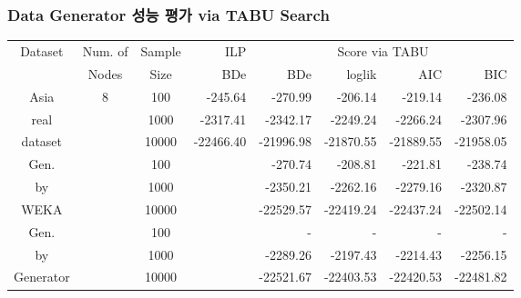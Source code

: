 \documentclass{beamer}
\begin{document}
\begin{frame}
\frametitle{Data Generator 성능 평가 via TABU Search}
{\scriptsize{}

\begin{center}
\begin{tabular}{c|c|c|r|r|r|r|r}
\hline 
\multirow{2}{*}{{\tiny{}Dataset}} & {\tiny{}Num. of} & {\tiny{}Sample} & {\tiny{}ILP} & \multicolumn{4}{c}{{\tiny{}Score via TABU}}\tabularnewline
\cline{4-8} 
 & {\tiny{}Nodes} & {\tiny{}Size} & {\tiny{}BDe} & {\tiny{}BDe} & {\tiny{}loglik} & {\tiny{}AIC} & {\tiny{}BIC}\tabularnewline
\hline 
{\tiny{}Asia} & \multirow{9}{*}{{\tiny{}8}} & {\tiny{}100} & {\tiny{}-245.64} & {\tiny{}-270.99} & {\tiny{}-206.14} & {\tiny{}-219.14} & {\tiny{}-236.08}\tabularnewline
{\tiny{}real} &  & {\tiny{}1000} & {\tiny{}-2317.41} & {\tiny{}-2342.17} & {\tiny{}-2249.24} & {\tiny{}-2266.24} & {\tiny{}-2307.96}\tabularnewline
{\tiny{}dataset} &  & {\tiny{}10000} & {\tiny{}-22466.40} & {\tiny{}-21996.98} & {\tiny{}-21870.55} & {\tiny{}-21889.55} & {\tiny{}-21958.05}\tabularnewline
\cline{1-1} \cline{3-8} 
{\tiny{}Gen.} &  & {\tiny{}100} &  & {\tiny{}-270.74} & {\tiny{}-208.81} & {\tiny{}-221.81} & {\tiny{}-238.74}\tabularnewline
{\tiny{}by} &  & {\tiny{}1000} &  & {\tiny{}-2350.21} & {\tiny{}-2262.16} & {\tiny{}-2279.16} & {\tiny{}-2320.87}\tabularnewline
{\tiny{}WEKA} &  & {\tiny{}10000} &  & {\tiny{}-22529.57} & {\tiny{}-22419.24} & {\tiny{}-22437.24} & {\tiny{}-22502.14}\tabularnewline
\cline{1-1} \cline{3-8} 
{\tiny{}Gen.} &  & {\tiny{}100} &  & {\tiny{}-} & {\tiny{}-} & {\tiny{}-} & {\tiny{}-}\tabularnewline
{\tiny{}by} &  & {\tiny{}1000} &  & {\tiny{}-2289.26} & {\tiny{}-2197.43} & {\tiny{}-2214.43} & {\tiny{}-2256.15}\tabularnewline
{\tiny{}Generator} &  & {\tiny{}10000} &  & {\tiny{}-22521.67} & {\tiny{}-22403.53} & {\tiny{}-22420.53} & {\tiny{}-22481.82}\tabularnewline
\hline 
\end{tabular}

\end{center}
}
\end{frame}
\end{document}
